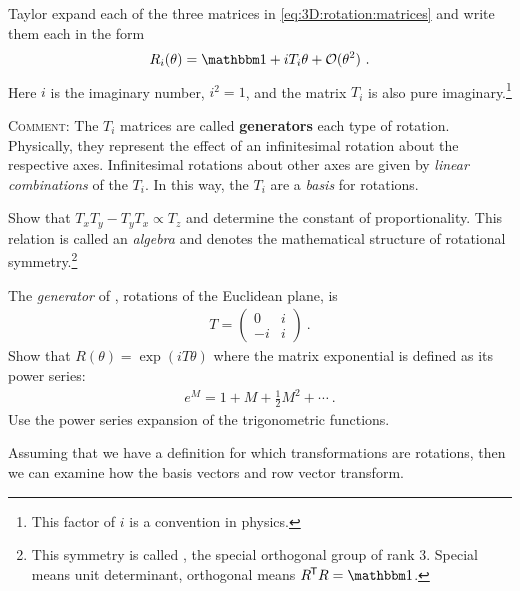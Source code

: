 \documentclass[12pt, oneside]{report}    %
\begin{document}
\begin{exercise}
Taylor expand each of the three matrices in \eqref{eq:3D:rotation:matrices} and write them each in the form
\begin{align}
    R_i(\theta) = \one + i T_i \theta + \mathcal O(\theta^2) \ .
\end{align}
Here $i$ is the imaginary number, $i^2=1$, and the matrix $T_i$ is also pure imaginary.\footnote{This factor of $i$ is a convention in physics.} 

\textsc{Comment:}
The $T_i$ matrices are called \textbf{generators} each type of rotation. Physically, they represent the effect of an infinitesimal rotation about the respective axes. Infinitesimal rotations about other axes are given by \emph{linear combinations} of the $T_i$. In this way, the $T_i$ are a \emph{basis} for rotations.

Show that $T_xT_y - T_y T_x \propto T_z$ and determine the constant of proportionality. This relation is called an \emph{algebra} and denotes the mathematical structure of rotational symmetry.\footnote{This symmetry is called , the special orthogonal group of rank 3. Special means unit determinant, orthogonal means $R^\trans R = \one$.}
\end{exercise}

\begin{exercise}
The \emph{generator} of , rotations of the Euclidean plane, is
\begin{align}
    T = \begin{pmatrix}
        0 & i \\
        -i & i
    \end{pmatrix} \ .
\end{align}
Show that $R(\theta) = \exp(iT\theta)$ where the matrix exponential is defined as its power series:
\begin{align}
    e^{M} = 1 + M + \frac{1}{2}M^2 + \cdots \ .
\end{align}
Use the power series expansion of the trigonometric functions. 
\end{exercise}

Assuming that we have a definition for which transformations are rotations, then we can examine how the basis vectors and row vector transform.

\end{document}
